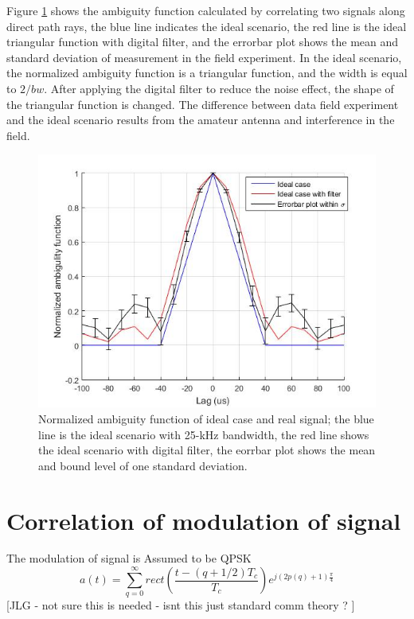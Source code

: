 \documentclass[draftcls,onecolumn]{IEEEtran}  %
\begin{document}
Figure \ref{fig:ACF} shows the ambiguity function calculated by correlating two signals along direct path rays, the blue line indicates the ideal scenario, the red line is the ideal triangular function with digital filter, and the errorbar plot shows the mean and standard deviation of measurement in the field experiment. In the ideal scenario, the normalized ambiguity function is a triangular function, and the width is equal to $2/bw$. After applying the digital filter to reduce the noise effect, the shape of the triangular function is changed. The difference between data field experiment and the ideal scenario results from the amateur antenna and interference in the field.
\begin{figure}[h]
	\centering
	\includegraphics[width=\textwidth]{pdf/ACF.jpg}
	\caption{Normalized ambiguity function of ideal case and real signal; the blue line is the ideal scenario with 25-kHz bandwidth, the red line shows the ideal scenario with digital filter, the eorrbar plot shows the mean and bound level of one standard deviation.}
	\centering
	\label{fig:ACF}
\end{figure}

   
   
\section{Correlation of modulation of signal} \label{App: Ra}
The modulation of signal is Assumed to be QPSK
\begin{equation}
a(t)=\sum_{q=0}^{\infty}rect(\frac{t-(q+1/2)T_c}{T_c})e^{j(2p(q)+1)\frac{\pi}{4}}
\end{equation}
[JLG - not sure this is needed - isnt this just standard comm theory ? ]
\end{document}
